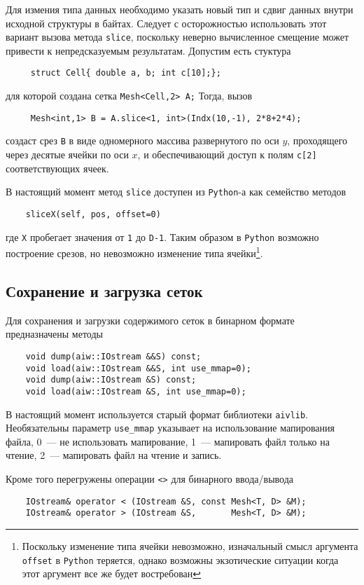 Для измения типа данных необходимо указать новый тип и сдвиг данных внутри исходной структуры в байтах.
Следует с осторожностью использовать этот вариант вызова метода {\tt slice}, поскольку
неверно вычисленное смещение может привести к непредсказуемым результатам. Допустим есть
стуктура 
\begin{verbatim}
     struct Cell{ double a, b; int c[10];}; 
\end{verbatim}
для которой создана сетка \verb'Mesh<Cell,2> A;' Тогда, вызов 
\begin{verbatim}
     Mesh<int,1> B = A.slice<1, int>(Indx(10,-1), 2*8+2*4);
\end{verbatim}
создаст срез {\tt B} в виде одномерного массива развернутого по оси $y$, проходящего
через десятые ячейки по оси $x$, и обеспечивающий доступ к полям {\tt c[2]}
соответствующих ячеек. 

В настоящий момент метод \verb'slice' доступен из \verb'Python'-а как семейство методов
\begin{verbatim}
    sliceX(self, pos, offset=0)
\end{verbatim}
где \verb'X' пробегает значения от \verb'1' до \verb'D-1'. Таким образом в \verb'Python' возможно построение срезов, но невозможно
изменение типа ячейки\footnote{Поскольку изменение типа ячейки невозможно, изначальный смысл аргумента {\tt offset} в {\tt Python} теряется,
однако возможны экзотические ситуации когда этот аргумент все же будет востребован}. 


\subsection{Сохранение и загрузка сеток}
Для сохранения и загрузки содержимого сеток в бинарном формате предназначены методы
\begin{verbatim}
    void dump(aiw::IOstream &&S) const;
    void load(aiw::IOstream &&S, int use_mmap=0);
    void dump(aiw::IOstream &S) const;
    void load(aiw::IOstream &S, int use_mmap=0);
\end{verbatim}
В настоящий момент используется старый формат библиотеки \verb'aivlib'. Необязательны параметр \verb'use_mmap' 
указывает на использование мапирования файла, 0~--- не использовать мапирование, 1~--- мапировать файл только на чтение,
2~--- мапировать файл на чтение и запись.

Кроме того перегружены операции \verb'<>' для бинарного ввода/вывода
\begin{verbatim}		
    IOstream& operator < (IOstream &S, const Mesh<T, D> &M);
    IOstream& operator > (IOstream &S,       Mesh<T, D> &M);
\end{verbatim}

